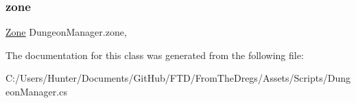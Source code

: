 \mbox{\label{class_dungeon_manager_a4a1b9933b14faea37aeb07bd6f290774}} 
\subsubsection{\texorpdfstring{zone}{zone}}
{\footnotesize\ttfamily \mbox{\hyperlink{class_dungeon_manager_a6558d4a01889674bf25c798f1b90a431}{Zone}} Dungeon\+Manager.\+zone\hspace{0.3cm}{\ttfamily [get]}, {\ttfamily [set]}}



The documentation for this class was generated from the following file\+:\begin{DoxyCompactItemize}
\item 
C\+:/\+Users/\+Hunter/\+Documents/\+Git\+Hub/\+F\+T\+D/\+From\+The\+Dregs/\+Assets/\+Scripts/Dungeon\+Manager.\+cs\end{DoxyCompactItemize}
